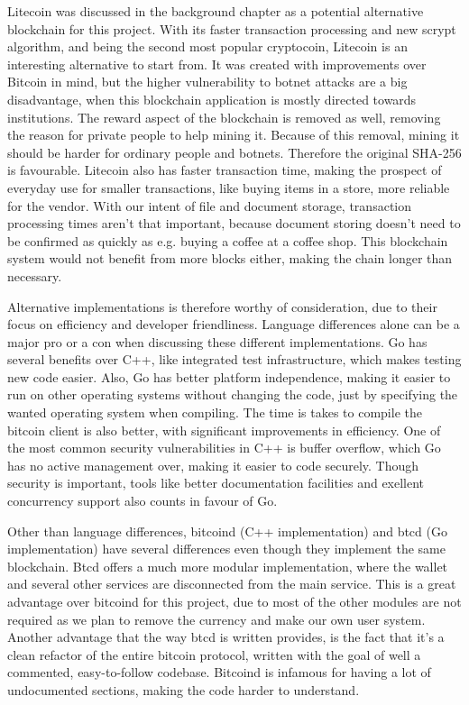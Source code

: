 \documentclass[12pt]{article}
\begin{document}
Litecoin was discussed in the background chapter as a potential alternative blockchain for this project. With its faster transaction processing and new scrypt algorithm, and being the second most popular cryptocoin, Litecoin is an interesting alternative to start from. It was created with improvements over Bitcoin in mind, but the higher vulnerability to botnet attacks are a big disadvantage, when this blockchain application is mostly directed towards institutions. The reward aspect of the blockchain is removed as well, removing the reason for private people to help mining it. Because of this removal, mining it should be harder for ordinary people and botnets. Therefore the original SHA-256 is favourable. Litecoin also has faster transaction time, making the prospect of everyday use for smaller transactions, like buying items in a store, more reliable for the vendor. With our intent of file and document storage, transaction processing times aren't that important, because document storing doesn't need to be confirmed as quickly as e.g. buying a coffee at a coffee shop. This blockchain system would not benefit from more blocks either, making the chain longer than necessary. 

Alternative implementations is therefore worthy of consideration, due to their focus on efficiency and developer friendliness. Language differences alone can be a major pro or a con when discussing these different implementations. Go has several benefits over C++, like integrated test infrastructure, which makes testing new code easier. Also, Go has better platform independence, making it easier to run on other operating systems without changing the code, just by specifying the wanted operating system when compiling. The time is takes to compile the bitcoin client is also better, with significant improvements in efficiency. One of the most common security vulnerabilities in C++ is buffer overflow, which Go has no active management over, making it easier to code securely. Though security is important, tools like better documentation facilities and exellent concurrency support also counts in favour of Go. 

Other than language differences, bitcoind (C++ implementation) and btcd (Go implementation)
have several differences even though they implement the same blockchain. Btcd offers a much more modular implementation, where the wallet and several other services are disconnected from the main service. This is a great advantage over bitcoind for this project, due to most of the other modules are not required as we plan to remove the currency and make our own user system. Another advantage that the way btcd is written provides, is the fact that it's a clean refactor of the entire bitcoin protocol, written with the goal of well a commented, easy-to-follow codebase. Bitcoind is infamous for having a lot of undocumented sections, making the code harder to understand. 
\end{document}
